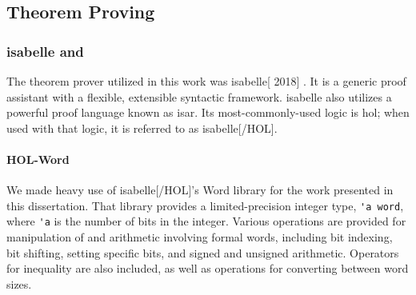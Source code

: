 %
%
%

\subsection{Theorem Proving}


\subsubsection{\Gls{isabelle} and }
The theorem prover utilized in this work
was \gls{isabelle}[ 2018] \autocite{nipkow2002isabelle}.
It is a generic proof assistant with a flexible, extensible syntactic framework.
\Gls{isabelle} also utilizes a powerful proof language
known as \gls{isar}.
Its most-commonly-used logic is \gls{hol}; when used with that logic,
it is referred to as \gls{isabelle}[/HOL].

\paragraph{HOL-Word}
We made heavy use of \gls{isabelle}[/HOL]'s Word library \autocite{isabelle-word-session}
for the work presented in this dissertation.
That library provides a limited-precision integer type, \lstinline|'a word|,
where \lstinline|'a| is the number of bits in the integer.
Various operations are provided for manipulation of and arithmetic
involving formal words, including bit indexing, bit shifting, setting specific bits,
and signed and unsigned arithmetic.
Operators for inequality are also included,
as well as operations for converting between word sizes.

